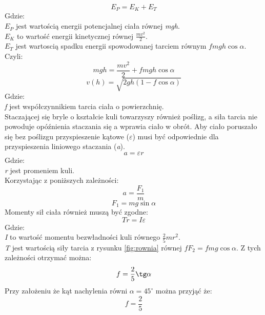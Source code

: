 \begin{equation}
E_{P} = E_{K} + E_{T}
\end{equation}
Gdzie:\\
$ E_{P} $ jest wartością energii potencjalnej ciała równej \emph{mgh}.\\
$ E_{K} $ to wartość energii kinetycznej równej $ \frac{mv^{2}}{2} $.\\
$ E_{T} $ jest wartoscią spadku energii spowodowanej tarciem równym $ fmgh \cos
\alpha $.\\
Czyli:\\
\begin{equation}
mgh = \frac{mv^{2}}{2} + fmgh \cos \alpha
\end{equation}
\begin{equation}
\label{eq:boxVelocity}
v(h) = \sqrt{2gh(1-f \cos \alpha)}
\end{equation}
Gdzie:\\
\emph{f} jest współczynnikiem tarcia ciała o powierzchnię.\\
Staczającej się bryle o kształcie kuli towarzyszy również poślizg, a
siła tarcia nie powoduje opóźnienia staczania się a wprawia ciało w obrót.
Aby ciało poruszało się bez poślizgu przyspieszenie kątowe ($ \varepsilon $) musi
być odpowiednie dla przyspieszenia liniowego staczania (\emph{a}).
\begin{equation}
a = \varepsilon r
\end{equation}
Gdzie:\\
\emph{r} jest promeniem kuli.\\
Korzystając z poniższych zależności:
\begin{equation}
a = \frac{F_{1}}{m}
\end{equation}
\begin{equation}
F_{1} = mg \sin \alpha
\end{equation}
Momenty sił ciała również muszą być zgodne:
\begin{equation}
Tr = I \varepsilon
\end{equation}
Gdzie:\\
\emph{I} to wartość momentu bezwładności kuli równego $ \frac{2}{5}mr^{2} $.\\
\emph{T} jest wartością siły tarcia z rysunku \ref{fig:rownia} równej $ fF_{2}
= fmg \cos \alpha $.
Z tych zależności otrzymać można:
\begin{equation}
f = \frac{2}{5} \tg \alpha
\end{equation}
Przy założeniu że kąt nachylenia równi $ \alpha = 45^{\circ} $ można przyjąć
że:
\begin{equation}
f = \frac{2}{5}
\label{eq:friction}
\end{equation}


